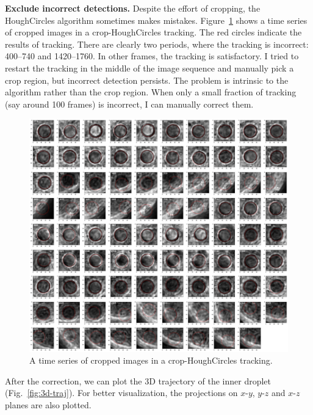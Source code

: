 \documentclass[onecolumn,aps, pre,amsmath,amssymb,longbibliography,11pt]{revtex4-2}
\begin{document}
\textbf{Exclude incorrect detections.}
Despite the effort of cropping, the HoughCircles algorithm sometimes makes mistakes.
Figure~\ref{fig:crop-HoughCircles-montage} shows a time series of cropped images in a crop-HoughCircles tracking.
The red circles indicate the results of tracking.
There are clearly two periods, where the tracking is incorrect: 400--740 and 1420--1760.
In other frames, the tracking is satisfactory.
I tried to restart the tracking in the middle of the image sequence and manually pick a crop region, but incorrect detection persists.
The problem is intrinsic to the algorithm rather than the crop region.
When only a small fraction of tracking (say around 100 frames) is incorrect, I can manually correct them.

\begin{figure}[h]
  \includegraphics[width=6in]{crop-HoughCircles-montage.jpg}
  \caption{A time series of cropped images in a crop-HoughCircles tracking.}
  \label{fig:crop-HoughCircles-montage}
\end{figure}

After the correction, we can plot the 3D trajectory of the inner droplet (Fig.~\ref{fig:3d-traj}).
For better visualization, the projections on $x$-$y$, $y$-$z$ and $x$-$z$ planes are also plotted.
\end{document}
